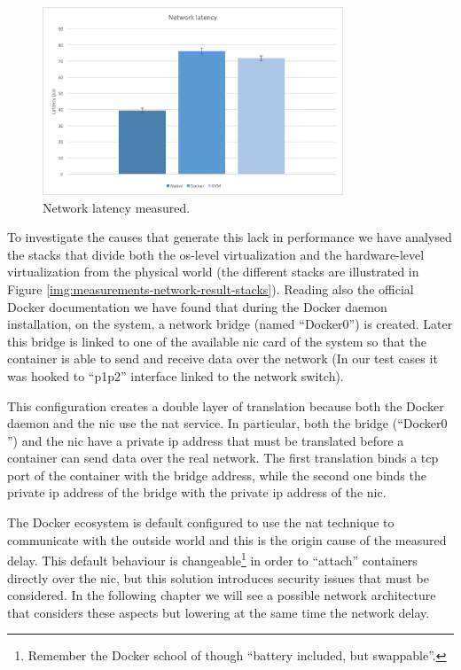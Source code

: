 \begin{figure}
	\centering{}
	\includegraphics[width=0.8\textwidth]{chapters/measurements/images/network-latency.png}
	\caption[Network - latency measured]{Network latency measured.}
	\label{img:measurements-network-results-latency}
\end{figure}

To investigate the causes that generate this lack in performance we have analysed the stacks that divide
both the \acs{os}-level virtualization and the hardware-level virtualization from the physical world (the
different stacks are illustrated in Figure \ref{img:measurements-network-result-stacks}). Reading also
the official Docker documentation we have found that during the Docker daemon installation, on the system,
a network bridge (named ``Docker$0$'') is created. Later this bridge is linked to one of the available
\ac{nic} card of the system so that the container is able to send and receive data over the network (In
our test cases it was hooked to ``p1p2'' interface linked to the network switch).

This configuration creates a double layer of translation because both the Docker daemon and the \ac{nic}
use the \ac{nat} service. In particular, both the bridge (``Docker$0$'') and the \ac{nic} have a
private \acs{ip} address that must be translated before a container can send data over the real network.
The first translation binds a \acs{tcp} port of the container with the bridge address, while the second
one binds the private \acs{ip} address of the bridge with the private \acs{ip} address of the \ac{nic}.

The Docker ecosystem is default configured to use the \ac{nat} technique to communicate with the outside
world and this is the origin cause of the measured delay. This default behaviour is changeable\footnote{
Remember the Docker school of though ``battery included, but swappable''.} in order to ``attach''
containers directly over the \ac{nic}, but this solution introduces security issues that must be
considered. In the following chapter we will see a possible network architecture that considers these
aspects but lowering at the same time the network delay.

